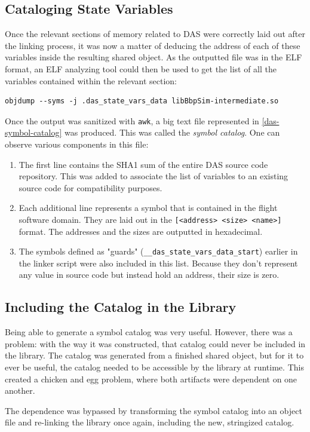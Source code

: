 {\subsection*{Cataloging State Variables}
Once the relevant sections of memory related to DAS were correctly laid out after the linking process, it was now a matter of deducing the address of each of these variables inside the resulting shared object. As the outputted file was in the ELF format, an ELF analyzing tool could then be used to get the list of all the variables contained within the relevant section:
\begin{verbatim}
objdump --syms -j .das_state_vars_data libBbpSim-intermediate.so
\end{verbatim}
Once the output was sanitized with \texttt{awk}, a big text file represented in  \autoref{das-symbol-catalog} was produced. This was called the \textit{symbol catalog}. One can observe various components in this file:
\begin{enumerate}
	\item The first line contains the SHA1 sum of the entire DAS source code repository. This was added to associate the list of variables to an existing source code for compatibility purposes.
	\item Each additional line represents a symbol that is contained in the flight software domain. They are laid out in the \verb|[<address> <size> <name>]| format. The addresses and the sizes are outputted in hexadecimal.
	\item The symbols defined as "guards" (\texttt{__das_state_vars_data_start}) earlier in the linker script were also included in this list. Because they don't represent any value in source code but instead hold an address, their size is zero.
\end{enumerate}

\subsection*{Including the Catalog in the Library}
Being able to generate a symbol catalog was very useful. However, there was a problem: with the way it was constructed, that catalog could never be included in the library. The catalog was generated from a finished shared object, but for it to ever be useful, the catalog needed to be accessible by the library at runtime. This created a chicken and egg problem, where both artifacts were dependent on one another.

The dependence was bypassed by transforming the symbol catalog into an object file and re-linking the library once again, including the new, stringized catalog. 

}
